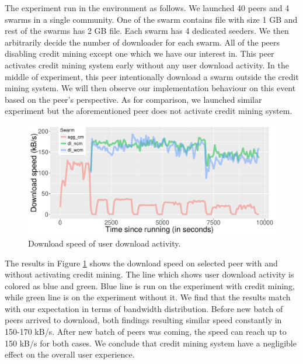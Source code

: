 The experiment run in the environment as follows. We launched 40 peers and 4 swarms in a single community. One of the swarm contains file with size 1 GB and rest of the swarms has 2 GB file. Each swarm has 4 dedicated seeders. We then arbitrarily decide the number of downloader for each swarm. All of the peers disabling credit mining except one which we have our interest in. This peer activates credit mining system early without any user download activity. In the middle of experiment, this peer intentionally download a swarm outside the credit mining system. We will then observe our implementation behaviour on this event based on the peer's perspective. As for comparison, we launched similar experiment but the aforementioned peer does not activate credit mining system. 

\begin{figure}[h!]
		\centering
		\includegraphics[width=\textwidth]{pics/results/pr_g2-act2.pdf}
		\caption{Download speed of user download activity.}
		\label{fig:cmprio}
\end{figure}

The results in Figure \ref{fig:cmprio} shows the download speed on selected peer with and without activating credit mining. The line which shows user download activity is colored as blue and green. Blue line is run on the experiment with credit mining, while green line is on the experiment without it. We find that the results match with our expectation in terms of bandwidth distribution. Before new batch of peers arrived to download, both findings resulting similar speed constantly in 150-170 kB/s. After new batch of peers was coming, the speed can reach up to 150 kB/s for both cases. We conclude that credit mining system have a negligible effect on the overall user experience. 

